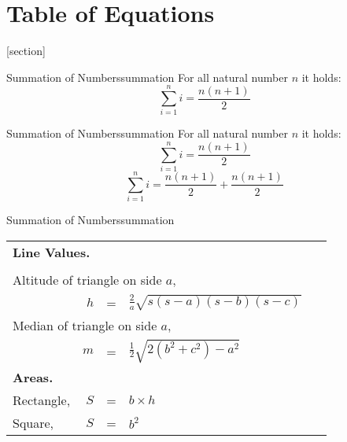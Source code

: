 \documentclass[twocolumn]{article}
\begin{document}
\section{Table of Equations}
[section]
\begin{tcolorbox}[colback=blue!5,colframe=blue!50!black,arc=0mm,
theorem={Equation}{texercise}{Summation}{myMarker}]{Summation of Numbers}{summation}
  For all natural number $n$ it holds:\\[2mm]
  \[\displaystyle\sum\limits_{i=1}^n i = \frac{n(n+1)}{2}\]
\end{tcolorbox}
\begin{tcolorbox}[colback=blue!5,colframe=blue!50!black,arc=0mm,
theorem={Equations}{texercise}{More on summation}{myMarker}]{Summation of Numbers}{summation}
  For all natural number $n$ it holds:\\[2mm]
   \[\displaystyle\sum\limits_{i=1}^n i = \frac{n(n+1)}{2}\]
  \[\displaystyle\sum\limits_{i=1}^n i = \frac{n(n+1)}{2}+ \frac{n(n+1)}{2}\]
\end{tcolorbox}

\begin{tcolorbox}[colback=blue!5,colframe=blue!50!black,arc=0mm,
theorem={Equations}{texercise}{More on summation}{myMarker}]{Summation of Numbers}{summation}
\medskip

\begin{tabular}{lr@{~}c@{~}l@{\qquad}r}
\multicolumn{5}{l}{\hspace{-2ex}\textbf{Line Values.}} \\
\multicolumn{5}{r}{}\\
\multicolumn{4}{l}{Altitude of triangle on side $a$,} \\
& $h$ &=& \( \displaystyle \frac{2}{a}
             \sqrt{s(s-a)(s-b)(s-c)} \) & \\
%
\multicolumn{4}{l}{Median of triangle on side $a$,} \\
& $m$ &=& \( \frac{1}{2} \sqrt{2(b^2+c^2) - a^2} \) & \ \\
\multicolumn{5}{l}{\hspace{-2ex}\textbf{Areas.}} \\
%
Rectangle,     & $S$ &=& $b\times h$ &  \\
Square,         & $S$ &=& $b^2$        &  \\
\end{tabular}
\end{tcolorbox}
\end{document}
